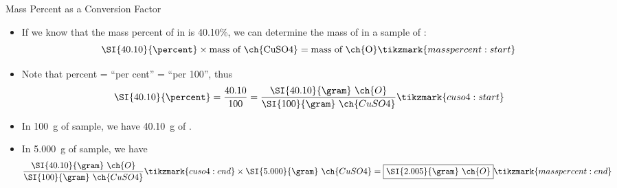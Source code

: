 \documentclass[notes=onlyslideswithnotes,notes=hide]{beamer}
\begin{document}
\begin{frame}[<+->]{Mass Percent as a Conversion Factor}
	\begin{itemize}
		\item If we know that the mass percent of  in 
			is 40.10\%, we can determine the mass of  in a
			sample of :
			\begin{equation*}
				\SI{40.10}{\percent} \times \text{mass of
				\ch{CuSO4}} = \text{mass of \ch{O}}\tikzmark{masspercent:start}
			\end{equation*}
		\item Note that percent = ``per cent'' = ``per 100'', thus
			\begin{equation*}
				\SI{40.10}{\percent} = \frac{40.10}{100} =
				\frac{\SI{40.10}{\gram}~\ch{O}}{\SI{100}{\gram}~\ch{CuSO4}}\tikzmark{cuso4:start}
			\end{equation*}
		\item In \SI{100}{\gram} of sample, we have \SI{40.10}{\gram} of .
		\item In \SI{5.000}{\gram} of sample, we have
			\begin{align*}
				\frac{\SI{40.10}{\gram}~\ch{O}}{\SI{100}{\gram}~\ch{CuSO4}}\tikzmark{cuso4:end} \times \SI{5.000}{\gram}~\ch{CuSO4} &= \boxed{\SI{2.005}{\gram}~\ch{O}}\tikzmark{masspercent:end} \\
			\end{align*}
	\end{itemize}

\end{frame}
\end{document}
